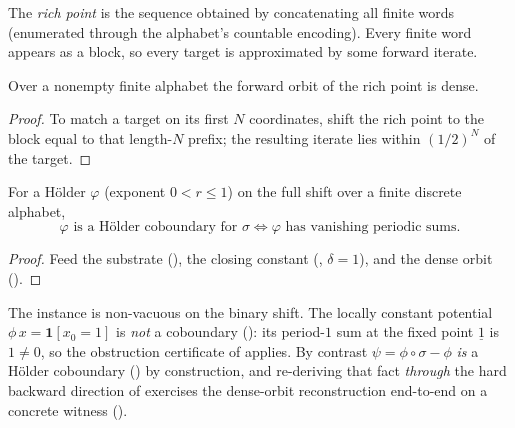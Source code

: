 \begin{definition}\label{def:livsic-richpoint}
  \leanok
  The \emph{rich point} is the sequence obtained by concatenating all finite words (enumerated
  through the alphabet's countable encoding). Every finite word appears as a block, so every target
  is approximated by some forward iterate.
\end{definition}

\begin{theorem}\label{thm:livsic-shift-dense}
  \leanok
  Over a nonempty finite alphabet the forward orbit of the rich point is dense.
\end{theorem}
\begin{proof}\leanok
  To match a target on its first \(N\) coordinates, shift the rich point to the block equal to that
  length-\(N\) prefix; the resulting iterate lies within \((1/2)^{N}\) of the target.
\end{proof}

\begin{theorem}\label{thm:livsic-fullshift}
  \leanok
  For a Hölder \(\varphi\) (exponent \(0 < r\le 1\)) on the full shift over a finite discrete
  alphabet,
  \[
    \varphi \text{ is a Hölder coboundary for } \sigma \iff \varphi \text{ has vanishing periodic sums}.
  \]
\end{theorem}
\begin{proof}\leanok
  Feed  the substrate (), the closing constant
  (, \(\delta = 1\)), and the dense orbit
  ().
\end{proof}

The instance is non-vacuous on the binary shift. The locally constant potential
\(\phi\,x = \mathbf 1[x_0 = 1]\) is \emph{not} a coboundary
(): its period-\(1\) sum at the fixed point
\(\underline 1\) is \(1\ne 0\), so the obstruction certificate of  applies.
By contrast \(\psi = \phi\circ\sigma - \phi\) \emph{is} a Hölder coboundary
() by construction, and re-deriving that fact
\emph{through} the hard backward direction of  exercises the dense-orbit
reconstruction end-to-end on a concrete witness
().

